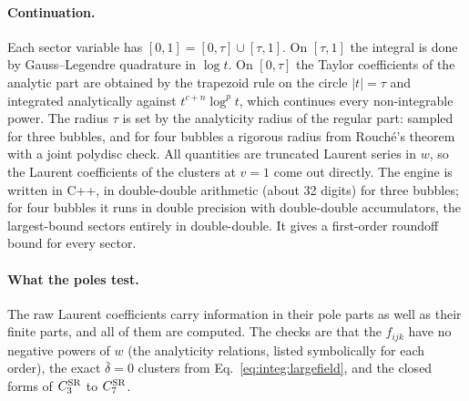 \documentclass[11pt,a4paper]{article}
\numberwithin{equation}{section}
\newcommand{\CSR}{C^{\rm SR}}
\newcommand{\db}{\bar\delta}
\begin{document}
\paragraph{Continuation.} Each sector variable has $[0,1]=[0,\tau]\cup[\tau,1]$. On $[\tau,1]$ the integral is done by
Gauss--Legendre quadrature in $\log t$. On $[0,\tau]$ the Taylor coefficients of the analytic part are obtained by the
trapezoid rule on the circle $|t|=\tau$ and integrated analytically against $t^{c+n}\log^pt$, which continues every
non-integrable power. The radius $\tau$ is set by the analyticity radius of the regular part: sampled for three bubbles,
and for four bubbles a rigorous radius from Rouch\'e's theorem with a joint polydisc check. All quantities are
truncated Laurent series in $w$, so the Laurent coefficients of the clusters at $v=1$ come out directly. The engine is
written in C++, in double-double arithmetic (about 32 digits) for three bubbles; for four bubbles it runs in double
precision with double-double accumulators, the largest-bound sectors entirely in double-double. It gives a first-order
roundoff bound for every sector.

\paragraph{What the poles test.} The raw Laurent coefficients carry information in their pole parts as well as their
finite parts, and all of them are computed. The checks are that the $f_{ijk}$ have no negative powers of $w$ (the
analyticity relations, listed symbolically for each order), the exact $\db=0$ clusters from
Eq.~\eqref{eq:integ:largefield}, and the closed forms of $\CSR_3$ to $\CSR_7$.

\end{document}
